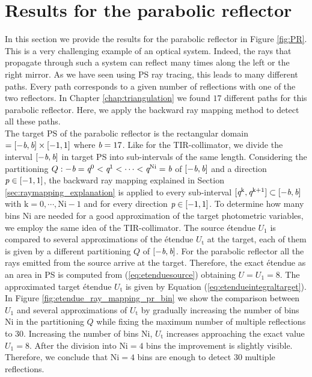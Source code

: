 \section{Results for the parabolic reflector}\label{sec:PR}
In this section we provide the results for the parabolic reflector in Figure \ref{fig:PR}.
This is a very challenging example of an optical system. Indeed, the rays that propagate through such a system can reflect many times along the left or the right mirror. As we have seen using PS ray tracing, this leads to many different paths. Every path corresponds to a given number of reflections with one of the two reflectors. In Chapter \ref{chap:triangulation} we found $17$ different paths for this parabolic reflector. Here, we apply the backward ray mapping method to detect all these paths. \\ \indent
The target PS of the parabolic reflector is the rectangular domain $=[-\textit{b}, \textit{b}]\times[-1,1]$ where $\textit{b}=17$. Like for the TIR-collimator, we divide the interval $[-\textit{b}, \textit{b}]$ in target PS into sub-intervals of the same length. Considering the partitioning $Q: -\textit{b}=\textit{q}^{0}<\textit{q}^{1}<\cdots<\textit{q}^{\textrm{Ni}}=\textit{b}$ of $[-\textit{b}, \textit{b}]$ and a direction $\textit{p}\in[-1,1]$, the backward ray mapping explained in Section \ref{sec:raymapping_explanation} is applied to every sub-interval $[\textit{q}^{\textrm{k}}, \textit{q}^{\textrm{k+1}}]\subset[-\textit{b}, \textit{b}]$ with $\textrm{k}=0, \cdots, \textrm{Ni}-1$ and for every direction $\textit{p}\in[-1,1]$. To determine how many bins $\textrm{Ni}$ are needed for a good approximation of the target photometric variables, we employ the same idea of the TIR-collimator. The source \'{e}tendue $U_1$ is compared to several approximations of the \'{e}tendue $U_{\textrm{t}}$ at the target, each of them is given by a different partitioning $Q$ of $[-\textit{b}, \textit{b}]$. For the parabolic reflector all the rays emitted from the source arrive at the target. Therefore, the exact \'{e}tendue as an area in PS is computed from (\ref{eq:etenduesource}) obtaining $U=U_1=8$. The approximated target \'{e}tendue $U_{\textrm{t}}$ is given by Equation (\ref{eq:etendueintegraltarget}). In Figure \ref{fig:etendue_ray_mapping_pr_bin} we show the comparison between $U_1$ and several approximations of $U_{\textrm{t}}$ by gradually increasing the number of bins $\textrm{Ni}$ in the partitioning $Q$ while fixing the maximum number of multiple reflections to $30$. Increasing the number of bins $\textrm{Ni}$, $U_{\textrm{t}}$ increases approaching the exact value $U_1=8$. After the division into $\textrm{Ni}=4$ bins the improvement is slightly visible. Therefore, we conclude that $\textrm{Ni}=4$ bins are enough to detect $30$ multiple reflections.
